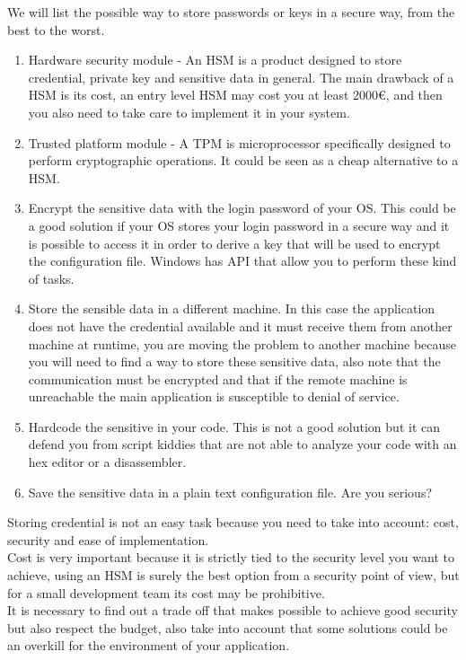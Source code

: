 We will list the possible way to store passwords or keys in a secure way, from the best to the worst.\\
\begin{enumerate}
\item Hardware security module - An HSM is a product designed to store credential, private key and sensitive data in general.
The main drawback of a HSM is its cost, an entry level HSM may cost you at least 2000€, and then you also need to take care to implement it in your system.
\item Trusted platform module - A TPM is microprocessor specifically designed to perform cryptographic operations.
It could be seen as a cheap alternative to a HSM.
\item Encrypt the sensitive data with the login password of your OS.
This could be a good solution if your OS stores your login password in a secure way and it is possible to access it in order to derive a key that will be used to encrypt the configuration file.
Windows has API that allow you to perform these kind of tasks.
\item Store the sensible data in a different machine.
In this case the application does not have the credential available and it must receive them from another machine at runtime, you are moving the problem to another machine because you will need to find a way to store these sensitive data, also note that the communication must be encrypted and that if the remote machine is unreachable the main application is susceptible to denial of service.
\item Hardcode the sensitive in your code.
This is not a good solution but it can defend you from script kiddies that are not able to analyze your code with an hex editor or a disassembler.
\item Save the sensitive data in a plain text configuration file.
Are you serious?
\end{enumerate}

Storing credential is not an easy task because you need to take into account: cost, security and ease of implementation.\\
Cost is very important because it is strictly tied to the security level you want to achieve, using an HSM is surely the best option from a security point of view, but for a small development team its cost may be prohibitive.\\
It is necessary to find out a trade off that makes possible to achieve good security but also respect the budget, also take into account that some solutions could be an overkill for the environment of your application.\\

